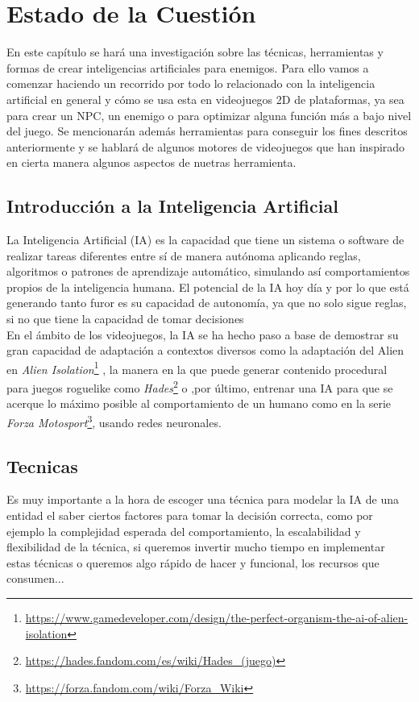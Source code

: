 \chapter{Estado de la Cuestión}
\label{cap:estadoDeLaCuestion}
En este capítulo se hará una investigación sobre las técnicas, herramientas y formas de crear inteligencias artificiales para enemigos.
Para ello vamos a comenzar haciendo un recorrido por todo lo relacionado con la inteligencia artificial en general y cómo se usa esta en videojuegos 2D de plataformas, ya sea para crear un NPC, un enemigo o para optimizar alguna función más a bajo nivel del juego.
Se mencionarán además herramientas para conseguir los fines descritos anteriormente y se hablará de algunos motores de videojuegos que han inspirado en cierta manera algunos aspectos de nuetras herramienta. \\
\section{Introducción a la Inteligencia Artificial}

La Inteligencia Artificial (IA) es la capacidad que tiene un sistema o software de realizar tareas diferentes entre sí de manera autónoma aplicando reglas, algoritmos o patrones de aprendizaje automático, simulando así comportamientos propios de la inteligencia humana.
El potencial de la IA hoy día y por lo que está generando tanto furor es su capacidad de autonomía, ya que no solo sigue reglas, si no que tiene la capacidad de tomar decisiones\\
En el ámbito de los videojuegos, la IA se ha hecho paso a base de demostrar su gran capacidad de adaptación a contextos diversos como la adaptación del Alien en \textit{Alien Isolation}\footnote{\url{https://www.gamedeveloper.com/design/the-perfect-organism-the-ai-of-alien-isolation}} , la manera en la que puede generar contenido procedural para juegos roguelike como \textit{Hades}\footnote{\url{https://hades.fandom.com/es/wiki/Hades_(juego)}} o ,por último, entrenar una IA para que se acerque lo máximo posible al comportamiento de un humano como en la serie \textit{Forza Motosport}\footnote{\url{https://forza.fandom.com/wiki/Forza_Wiki}}, usando redes neuronales.\\
\section{Tecnicas}

Es muy importante a la hora de escoger una técnica para modelar la IA de una entidad el saber ciertos factores para tomar la decisión correcta, como por ejemplo la complejidad esperada del comportamiento, la escalabilidad y flexibilidad de la técnica, si queremos invertir mucho tiempo en implementar estas técnicas o queremos algo rápido de hacer y funcional, los recursos que consumen... \\

